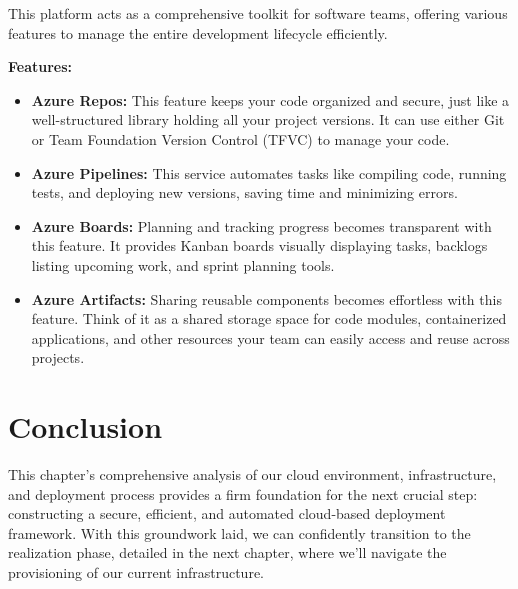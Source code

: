 This platform acts as a comprehensive toolkit for software teams, offering various features to manage the entire development lifecycle efficiently.
\par
\textbf{Features:}
\begin{itemize}
    \item \textbf{Azure Repos:} This feature keeps your code organized and secure, just like a well-structured library holding all your project versions. It can use either Git or Team Foundation Version Control (TFVC) to manage your code.
    \item \textbf{Azure Pipelines:}  This service automates tasks like compiling code, running tests, and deploying new versions, saving time and minimizing errors.
    \item \textbf{Azure Boards:} Planning and tracking progress becomes transparent with this feature. It provides Kanban boards visually displaying tasks, backlogs listing upcoming work, and sprint planning tools.
    \item \textbf{Azure Artifacts:} Sharing reusable components becomes effortless with this feature. Think of it as a shared storage space for code modules, containerized applications, and other resources your team can easily access and reuse across projects.
\end{itemize}

\section*{Conclusion}
This chapter's comprehensive analysis of our cloud environment, infrastructure, and deployment process provides a firm foundation for the next crucial step: constructing a secure, efficient, and automated cloud-based deployment framework. With this groundwork laid, we can confidently transition to the realization phase, detailed in the next chapter, where we'll navigate the provisioning of our current infrastructure.
